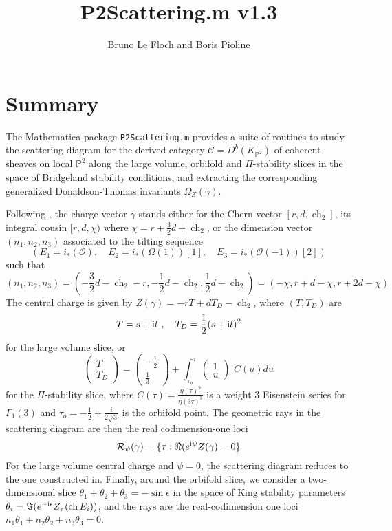 \documentclass[12pt]{JHEP3}
\title{P2Scattering.m v1.3}
\author{Bruno Le Floch and Boris Pioline}
\newcommand{\cC}{\mathcal{C}}
\newcommand{\cO}{\mathcal{O}}
\newcommand{\IP}{\mathbb{P}}
\newcommand{\be}{\begin{equation}}
\newcommand{\ee}{\end{equation}}
\newcommand{\cR}{\mathcal{R}}
\newcommand{\I}{{\rm i}}
\DeclareMathOperator{\ch}{ch}
\begin{document}
\maketitle

\baselineskip 15pt

\tableofcontents

\medskip

\section{Summary}

The  {\sc Mathematica} package {\tt P2Scattering.m} provides a suite of routines to study
the scattering diagram for the derived category $\cC=D^b(K_{\IP^2})$ of coherent sheaves on 
local $\IP^2$ along the large volume, orbifold and  $\Pi$-stability slices in the space of Bridgeland stability conditions, and extracting the corresponding generalized Donaldson-Thomas invariants $\Omega_Z(\gamma)$. 

Following \cite{P2Global}, the charge vector $\gamma$ stands either for 
the Chern vector $[r,d,\ch_2]$, its integral cousin $[r,d,\chi)$ where $\chi=r+\frac32d+\ch_2$,
or the dimension vector $(n_1,n_2,n_3)$ associated to the tilting sequence 
\be
(E_1=i_*(\cO), \quad E_2=i_*(\Omega(1))[1], \quad E_3 = i_*(\cO(-1))[2])
\ee
such that
\be
(n_1,n_2,n_3) = (-\frac32 d-\ch_2-r,  -\frac12 d-\ch_2, \frac12 d-\ch_2) = (-\chi, r+d-\chi,r+2d-\chi)
\ee
The central charge is given by $Z(\gamma)=-r T + d T_D -\ch_2$, where $(T,T_D)$ are 
\be
T= s+\I t\ ,\quad T_D = \frac12 (s+\I t)^2 
\ee 
for the large volume slice, or 
\be
\label{Eichler0}
 \begin{pmatrix} T \\ T_D  \end{pmatrix}
= \begin{pmatrix} -\frac12 \\ \frac13  \end{pmatrix} 
+  \int_{\tau_o}^{\tau} \begin{pmatrix} 1 \\u \end{pmatrix} \, 
\, C(u)  du
\ee
for the $\Pi$-stability slice, where $C (\tau) = \frac{\eta(\tau)^9}{\eta(3\tau)^3}$ is a
weight 3 Eisenstein series for $\Gamma_1(3)$ and $\tau_o=-\frac12+\frac{i}{2\sqrt3}$ is 
the orbifold point. The geometric rays in the scattering diagram are then the real codimension-one 
loci 
\be
\cR_\psi(\gamma) = \{ \tau : \Re(e^{\I\psi} Z(\gamma)=0 \}
\ee
For the large volume central charge and $\psi=0$, the scattering diagram reduces to the one
constructed in\cite{Bousseau:2019ift}.
Finally, around the orbifold slice, we 
consider a two-dimensional slice $\theta_1+\theta_2+\theta_3=-\sin\epsilon$ in the
space of King stability parameters $\theta_i=\Im(e^{-\I\epsilon} Z_\tau(\ch E_i))$, and the rays are
the real-codimension one loci $n_1\theta_1+n_2\theta_2+n_3\theta_3=0$. 
\end{document}
